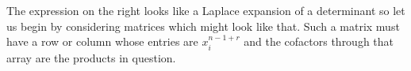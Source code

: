\documentclass[12pt]{memoir}
\begin{document}
\begin{ptcbr}
    The expression on the right looks like a Laplace expansion of a determinant so let us begin by considering matrices which might look like that. Such a matrix must have a row or column whose entries are $x_i^{n-1+r}$ and the cofactors through that array are the products in question.
\end{ptcbr}
\fi
\end{document}
